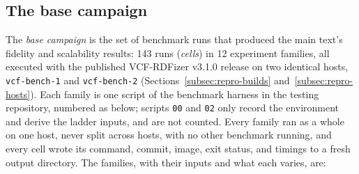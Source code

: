 \documentclass[11pt]{article}
\begin{document}
\subsection{The base campaign}\label{subsec:repro-campaign}
The \emph{base campaign} is the set of benchmark runs that produced the main text's fidelity and scalability results: 143 runs (\emph{cells}) in 12 experiment families, all executed with the published VCF-RDFizer v3.1.0 release on two identical hosts, \texttt{vcf-bench-1} and \texttt{vcf-bench-2} (Sections~\ref{subsec:repro-builds} and~\ref{subsec:repro-hosts}).
Each family is one script of the benchmark harness in the testing repository, numbered as below; scripts \texttt{00} and \texttt{02} only record the environment and derive the ladder inputs, and are not counted.
Every family ran as a whole on one host, never split across hosts, with no other benchmark running, and every cell wrote its command, commit, image, exit status, and timings to a fresh output directory.
The families, with their inputs and what each varies, are:
\end{document}
